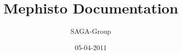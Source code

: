 \documentclass[a4paper,10pt]{article}
\newcommand{\jhanote}[1]{  {\textcolor{red}     { ***Shantenu: #1 }}}
\newcommand{\jhanote}[1]{}
\begin{document}
 \title{ \Large \vspace{-3.5em} Mephisto Documentation }
 
 \author{ SAGA-Group}
 \date{05-04-2011}
 \maketitle
 







% 
%  
% 
\end{document}
